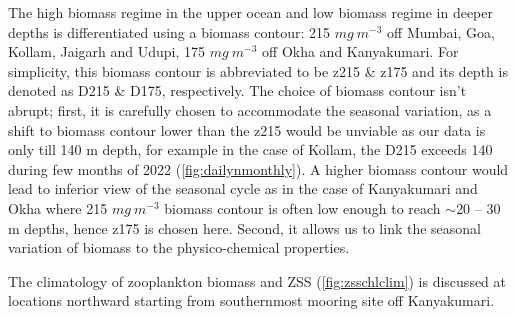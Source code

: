 \documentclass{article}
\begin{document}
	

	The high biomass regime in the upper ocean and low biomass regime in deeper depths is differentiated using a biomass contour: 215 $mg \ m^{-3}$ off Mumbai, Goa, Kollam, Jaigarh and Udupi, 175 $mg \ m^{-3}$ off Okha and Kanyakumari. For simplicity, this biomass contour is abbreviated to be z215 \& z175 and its depth is denoted as D215 \& D175, respectively. The choice of biomass contour isn't abrupt; first, it is carefully chosen to accommodate the seasonal variation, as a shift to biomass contour lower than the z215 would be unviable as our data is only till 140 m depth, for example in the case of Kollam, the D215 exceeds 140 during few months of 2022 (\cref{fig:dailynmonthly}). A higher biomass contour would lead to inferior view of the seasonal cycle as in the case of Kanyakumari and Okha where 215 $mg \ m^{-3}$ biomass contour is often low enough to reach $\sim$20 -- 30 m depths, hence z175 is chosen here. Second, it allows us to link the seasonal variation of biomass to the physico-chemical properties.
	
	The climatology of zooplankton biomass and ZSS (\cref{fig:zsschlclim}) is discussed at locations northward starting from southernmost mooring site off Kanyakumari. 
	 
\end{document}
